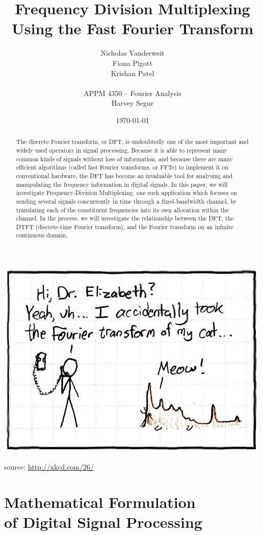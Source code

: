 \documentclass[12pt]{article}
\title{Frequency Division Multiplexing \\Using the Fast Fourier Transform }
\author{Nicholas Vanderweit \\Fiona Pigott \\Krishan Patel \\ \\APPM 4350 --
        Fourier Analysis \\Harvey Segur}
\date{\today}
\begin{document}
\maketitle


\begin{abstract}

The discrete Fourier transform, or DFT, is undoubtedly one of the most
important and widely used operators in signal processing. Because it is
able to represent many common kinds of signals without loss of information, and
because there are many efficient algorithms (called fast Fourier transforms, or
FFTs) to implement it on conventional hardware, the DFT has become an
invaluable tool for analysing and manipulating the frequency information in
digital signals. In this paper, we will investigate Frequency-Division
Multiplexing, one such application which focuses on sending several signals
concurrently in time through a fixed-bandwidth channel, by translating each of
the constituent frequencies into its own allocation within the channel. In the
process, we will investigate the relationship between the DFT, the DTFT
(discrete-time Fourier transform), and the Fourier transform on an infinite
continuous domain.

\end{abstract}

\begin{center}
\includegraphics[width=.5\linewidth]{fourier.jpg}

source: \url{http://xkcd.com/26/}
\end{center}

\clearpage

\section{Mathematical Formulation \\of Digital Signal Processing}
\end{document}
